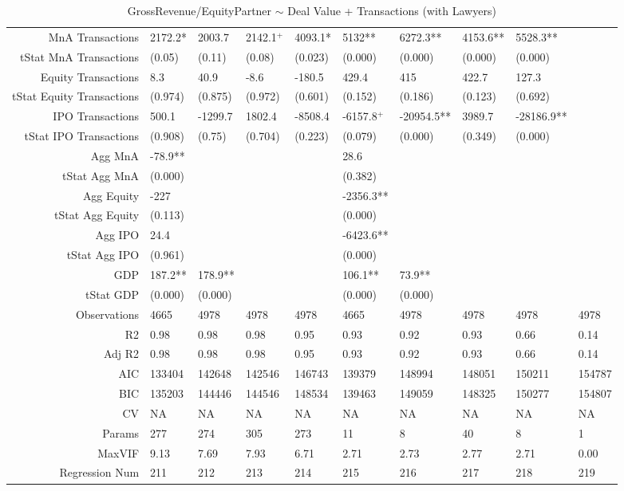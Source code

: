 \begin{table}[ht]
\begin{tabular}{rlllllllll}
  MnA Transactions & 2172.2* & 2003.7 & 2142.1$^{+}$ & 4093.1* & 5132** & 6272.3** & 4153.6** & 5528.3** &  \\ 
  tStat MnA Transactions & (0.05) & (0.11) & (0.08) & (0.023) & (0.000) & (0.000) & (0.000) & (0.000) &  \\ 
  Equity Transactions & 8.3 & 40.9 & -8.6 & -180.5 & 429.4 & 415 & 422.7 & 127.3 &  \\ 
  tStat Equity Transactions & (0.974) & (0.875) & (0.972) & (0.601) & (0.152) & (0.186) & (0.123) & (0.692) &  \\ 
  IPO Transactions & 500.1 & -1299.7 & 1802.4 & -8508.4 & -6157.8$^{+}$ & -20954.5** & 3989.7 & -28186.9** &  \\ 
  tStat IPO Transactions & (0.908) & (0.75) & (0.704) & (0.223) & (0.079) & (0.000) & (0.349) & (0.000) &  \\ 
  Agg MnA & -78.9** &  &  &  & 28.6 &  &  &  &  \\ 
  tStat Agg MnA & (0.000) &  &  &  & (0.382) &  &  &  &  \\ 
  Agg Equity & -227 &  &  &  & -2356.3** &  &  &  &  \\ 
  tStat Agg Equity & (0.113) &  &  &  & (0.000) &  &  &  &  \\ 
  Agg IPO & 24.4 &  &  &  & -6423.6** &  &  &  &  \\ 
  tStat Agg IPO & (0.961) &  &  &  & (0.000) &  &  &  &  \\ 
  GDP & 187.2** & 178.9** &  &  & 106.1** & 73.9** &  &  &  \\ 
  tStat GDP & (0.000) & (0.000) &  &  & (0.000) & (0.000) &  &  &  \\ 
  Observations & 4665 & 4978 & 4978 & 4978 & 4665 & 4978 & 4978 & 4978 & 4978 \\ 
  R2 & 0.98 & 0.98 & 0.98 & 0.95 & 0.93 & 0.92 & 0.93 & 0.66 & 0.14 \\ 
  Adj R2 & 0.98 & 0.98 & 0.98 & 0.95 & 0.93 & 0.92 & 0.93 & 0.66 & 0.14 \\ 
  AIC & 133404 & 142648 & 142546 & 146743 & 139379 & 148994 & 148051 & 150211 & 154787 \\ 
  BIC & 135203 & 144446 & 144546 & 148534 & 139463 & 149059 & 148325 & 150277 & 154807 \\ 
  CV & NA & NA & NA & NA & NA & NA & NA & NA & NA \\ 
  Params & 277 & 274 & 305 & 273 & 11 & 8 & 40 & 8 & 1 \\ 
  MaxVIF & 9.13 & 7.69 & 7.93 & 6.71 & 2.71 & 2.73 & 2.77 & 2.71 & 0.00 \\ 
  Regression Num & 211 & 212 & 213 & 214 & 215 & 216 & 217 & 218 & 219 \\ 
   \hline
\end{tabular}
\caption{GrossRevenue/EquityPartner $\sim$ Deal Value + Transactions (with Lawyers)} 
\end{table}
